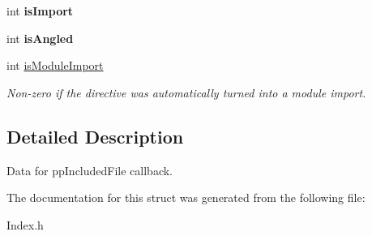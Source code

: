 \begin{DoxyCompactItemize}
\mbox{\label{structCXIdxIncludedFileInfo_ab6cc97a92d2eacfee24227703a334eae}} 
int {\bfseries is\+Import}
\item 
\mbox{\label{structCXIdxIncludedFileInfo_a899ca01c27e452a2716654c25b6e5fec}} 
int {\bfseries is\+Angled}
\item 
\mbox{\label{structCXIdxIncludedFileInfo_a9e84d589a428a85c4b8d62eae5e058f7}} 
int \mbox{\hyperlink{structCXIdxIncludedFileInfo_a9e84d589a428a85c4b8d62eae5e058f7}{is\+Module\+Import}}
\begin{DoxyCompactList}\small\item\em Non-\/zero if the directive was automatically turned into a module import. \end{DoxyCompactList}\end{DoxyCompactItemize}


\subsection{Detailed Description}
Data for pp\+Included\+File callback. 

The documentation for this struct was generated from the following file\+:\begin{DoxyCompactItemize}
\item 
Index.\+h\end{DoxyCompactItemize}
